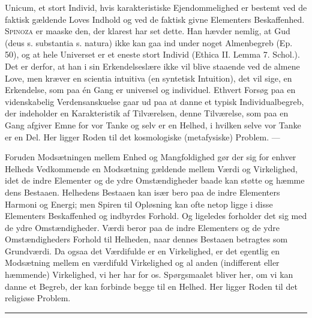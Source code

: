 \documentclass[12pt]{article}
\newcommand{\opage}[1]{\marginnote{\footnotesize\textit{[#1]}}}
\begin{document}
Unicum, et stort Individ, hvis karakteristiske Ejendommelighed er bestemt ved de
faktisk gældende Loves Indhold og ved de faktisk givne Elementers Beskaffenhed.
\textsc{Spinoza} er maaske den, der klarest har set dette. Han hævder nemlig, at
Gud (deus s. substantia s. natura) ikke kan gaa ind under noget Almenbegreb (Ep.
50), og at hele Universet er et eneste stort Individ (Ethica II. Lemma 7.
Schol.). Det er derfor, at han i sin Erkendelseslære ikke vil blive staaende ved
de almene Love, men kræver en scientia intuitiva (en syntetisk Intuition), det
vil sige, en Erkendelse, som paa én Gang er universel og individuel. Ethvert
Forsøg paa en videnskabelig Verdensanskuelse gaar ud paa at danne et typisk
Individualbegreb, der indeholder en Karakteristik af Tilværelsen, denne
Tilværelse, som paa en Gang afgiver Emne for vor Tanke og selv er en Helhed, i
hvilken selve vor Tanke er en Del. Her ligger Roden til det kosmologiske
(metafysiske) Problem. ---

Foruden Modsætningen mellem Enhed og Mangfoldighed gør der sig for enhver
Helheds Vedkommende en Modsætning gældende mellem Værdi og Virkelighed,
\opage{78}idet de indre Elementer og de ydre Omstændigheder baade kan støtte og
hæmme dens Bestaaen. Helhedens Bestaaen kan især bero paa de indre Elementers
Harmoni og Energi; men Spiren til Opløsning kan ofte netop ligge i disse
Elementers Beskaffenhed og indbyrdes Forhold. Og ligeledes forholder det sig med
de ydre Omstændigheder. Værdi beror paa de indre Elementers og de ydre
Omstændigheders Forhold til Helheden, naar dennes Bestaaen betragtes som
Grundværdi. Da ogsaa det Værdifulde er en Virkelighed, er det egentlig en
Modsætning mellem en værdifuld Virkelighed og al anden (indifferent eller
hæmmende) Virkelighed, vi her har for os. Spørgsmaalet bliver her, om vi kan
danne et Begreb, der kan forbinde begge til en Helhed. Her ligger Roden til det
religiøse Problem.
\begin{center}
\rule{5em}{0.4pt}
\end{center}

\clearpage
\end{document}
